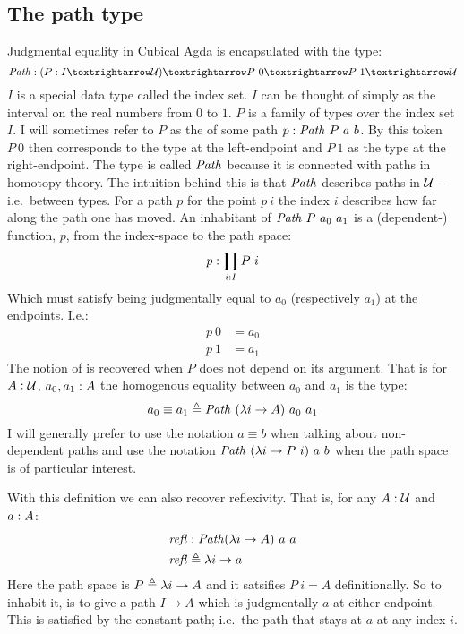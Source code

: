 \subsection{The path type}
Judgmental equality in Cubical Agda is encapsulated with the type:
%
\begin{equation}
\Path \tp (P \tp I → \MCU) → P\ 0 → P\ 1 → \MCU
\end{equation}
%
$I$ is a special data type called the index set. $I$ can be thought of
simply as the interval on the real numbers from $0$ to $1$. $P$ is a
family of types over the index set $I$. I will sometimes refer to $P$
as the  of some path $p \tp \Path\ P\ a\ b$. By
this token $P\ 0$ then corresponds to the type at the left-endpoint
and $P\ 1$ as the type at the right-endpoint. The type is called
$\Path$ because it is connected with paths in homotopy theory. The
intuition behind this is that $\Path$ describes paths in $\mathcal{U}$ --
i.e.\ between types. For a path $p$ for the point $p\ i$ the index $i$
describes how far along the path one has moved. An inhabitant of
$\Path\ P\ a_0\ a_1$ is a (dependent-) function, $p$, from the
index-space to the path space:
%
$$
p \mathrel{:} \prod_{i \mathrel{:} I} P\ i
$$
%
Which must satisfy being judgmentally equal to $a_0$ (respectively $a_1$) at the
endpoints. I.e.:
%
\begin{align*}
  p\ 0 & = a_0 \\
  p\ 1 & = a_1
\end{align*}
%
The notion of  is recovered when $P$ does not
depend on its argument. That is for $A \mathrel{:} \mathcal{U}$, $a_0, a_1 \mathrel{:} A$ the
homogenous equality between $a_0$ and $a_1$ is the type:
%
$$
a_0 \equiv a_1 \defeq \Path\ (\lambda i \to A)\ a_0\ a_1
$$
%
I will generally prefer to use the notation
$a \equiv b$ when talking about non-dependent paths and use the notation
$\Path\ (\lambda i \to P\ i)\ a\ b$ when the path space is of particular
interest.

With this definition we can also recover reflexivity. That is, for any $A \mathrel{:}
\mathcal{U}$ and $a \mathrel{:} A$:
%
\begin{equation}
\begin{aligned}
\refl & \tp \Path (\lambda i \to A)\ a\ a \\
\refl & \defeq \lambda i \to a
\end{aligned}
\end{equation}
%
Here the path space is $P \mathrel{\triangleq} \lambda i \to A$ and it satsifies $P\ i = A$
definitionally. So to inhabit it, is to give a path $I \to A$ which is
judgmentally $a$ at either endpoint. This is satisfied by the constant path;
i.e.\ the path that stays at $a$ at any index $i$.

